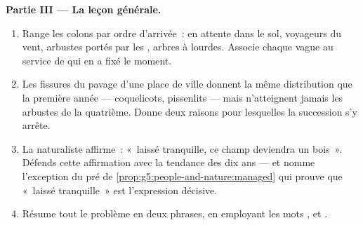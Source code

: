 \begin{problem}
\medskip\noindent\textbf{Partie III --- La leçon générale.}
\begin{enumerate}[resume]
  \item Range les colons par ordre d'arrivée~:  en attente
        dans le sol, voyageurs du vent, arbustes portés par les
        , arbres à  lourdes. Associe chaque vague au
        service de  qui en a fixé le moment.
  \item Les fissures du pavage d'une place de ville donnent la même
        distribution que la première année --- coquelicots,
        pissenlits --- mais n'atteignent jamais les arbustes de la
        quatrième. Donne deux raisons pour lesquelles la succession
        s'y arrête.
  \item La naturaliste affirme~: «~laissé tranquille, ce champ
        deviendra un bois~». Défends cette affirmation avec la
        tendance des dix ans --- et nomme l'exception du pré de
        \cref{prop:g5:people-and-nature:managed} qui prouve que
        «~laissé tranquille~» est l'expression décisive.
  \item Résume tout le problème en deux phrases, en employant les
        mots \emph{}, \emph{} et
        \emph{}.
\end{enumerate}
\end{problem}
